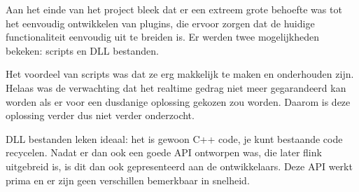 Aan het einde van het project bleek dat er een extreem grote behoefte was tot het eenvoudig ontwikkelen van plugins, die ervoor zorgen dat de huidige functionaliteit eenvoudig uit te breiden is. Er werden twee mogelijkheden bekeken: scripts en DLL bestanden.

Het voordeel van scripts was dat ze erg makkelijk te maken en onderhouden zijn. Helaas was de verwachting dat het realtime gedrag niet meer gegarandeerd kan worden als er voor een dusdanige oplossing gekozen zou worden. Daarom is deze oplossing verder dus niet verder onderzocht.

DLL bestanden leken ideaal: het is gewoon C++ code, je kunt bestaande code recycelen. Nadat er dan ook een goede API ontworpen was, die later flink uitgebreid is, is dit dan ook gepresenteerd aan de ontwikkelaars. Deze API werkt prima en er zijn geen verschillen bemerkbaar in snelheid.
